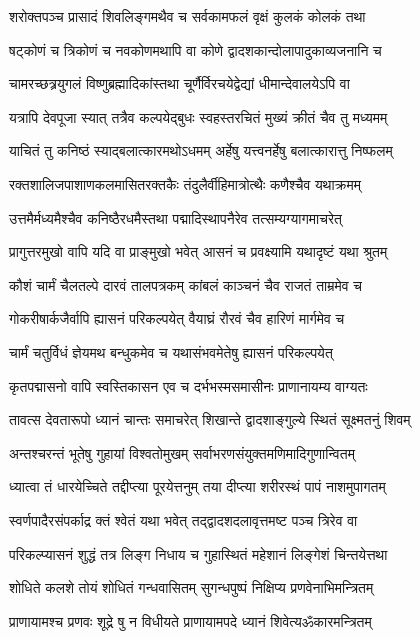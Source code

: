 \twolineshloka
{शरोक्तपञ्च प्रासादं शिवलिङ्गमथैव च}
{सर्वकामफलं वृक्षं कुलकं कोलकं तथा}%

\twolineshloka
{षट्कोणं च त्रिकोणं च नवकोणमथापि वा}
{कोणे द्वादशकान्दोलापादुकाव्यजनानि च}%

\twolineshloka
{चामरच्छत्र्रयुगलं विष्णुब्रह्मादिकांस्तथा}
{चूर्णैर्विरचयेद्वेद्यां धीमान्देवालयेऽपि वा}%

\twolineshloka
{यत्रापि देवपूजा स्यात् तत्रैव कल्पयेद्बुधः}
{स्वहस्तरचितं मुख्यं क्रीतं चैव तु मध्यमम्}%

\twolineshloka
{याचितं तु कनिष्ठं स्याद्बलात्कारमथोऽधमम्}
{अर्हेषु यत्त्वनर्हेषु बलात्कारात्तु निष्फलम्}%

\twolineshloka
{रक्तशालिजपाशाणकलमासितरक्तकैः}
{तंदुलैर्वीहिमात्रोत्थैः कणैश्चैव यथाक्रमम्}%

\twolineshloka
{उत्तमैर्मध्यमैश्चैव कनिष्ठैरधमैस्तथा}
{पद्मादिस्थापनैरेव तत्सम्यग्यागमाचरेत्}%

\twolineshloka
{प्रागुत्तरमुखो वापि यदि वा प्राङ्मुखो भवेत्}
{आसनं च प्रवक्ष्यामि यथादृष्टं यथा श्रुतम्}%

\twolineshloka
{कौशं चार्मं चैलतल्पे दारवं तालपत्रकम्}
{कांबलं काञ्चनं चैव राजतं ताम्रमेव च}%

\twolineshloka
{गोकरीषार्कजैर्वापि ह्यासनं परिकल्पयेत्}
{वैयाघ्रं रौरवं चैव हारिणं मार्गमेव च}%

\twolineshloka
{चार्मं चतुर्विधं ज्ञेयमथ बन्धुकमेव च}
{यथासंभवमेतेषु ह्यासनं परिकल्पयेत्}%

\twolineshloka
{कृतपद्मासनो वापि स्वस्तिकासन एव च}
{दर्भभस्मसमासीनः प्राणानायम्य वाग्यतः}%

\twolineshloka
{तावत्स देवतारूपो ध्यानं चान्तः समाचरेत्}
{शिखान्ते द्वादशाङ्गुल्ये स्थितं सूक्ष्मतनुं शिवम्}%

\twolineshloka
{अन्तश्चरन्तं भूतेषु गुहायां विश्वतोमुखम्}
{सर्वाभरणसंयुक्तमणिमादिगुणान्वितम्}%

\twolineshloka
{ध्यात्वा तं धारयेच्चिते तद्दीप्त्या पूरयेत्तनुम्}
{तया दीप्त्या शरीरस्थं पापं नाशमुपागतम्}%

\twolineshloka
{स्वर्णपादैरसंपर्काद्र क्तं श्वेतं यथा भवेत्}
{तद्द्वादशदलावृत्तमष्ट पञ्च त्रिरेव वा}%

\twolineshloka
{परिकल्प्यासनं शुद्धं तत्र लिङ्ग निधाय च}
{गुहास्थितं महेशानं लिङ्गेशं चिन्तयेत्तथा}%

\twolineshloka
{शोधिते कलशे तोयं शोधितं गन्धवासितम्}
{सुगन्धपुष्पं निक्षिप्य प्रणवेनाभिमन्त्रितम्}%

\twolineshloka
{प्राणायामश्च प्रणवः शूद्रे षु न विधीयते}
{प्राणायामपदे ध्यानं शिवेत्यॐकारमन्त्रितम्}%

